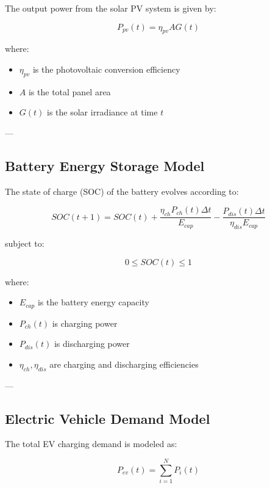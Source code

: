 The output power from the solar PV system is given by:

\begin{equation}
P_{pv}(t) = \eta_{pv} A G(t)
\label{eq:pv_power}
\end{equation}

where:
\begin{itemize}
    \item $\eta_{pv}$ is the photovoltaic conversion efficiency
    \item $A$ is the total panel area
    \item $G(t)$ is the solar irradiance at time $t$
\end{itemize}

---

\subsection{Battery Energy Storage Model}

The state of charge (SOC) of the battery evolves according to:

\begin{equation}
SOC(t+1) = SOC(t) + \frac{\eta_{ch} P_{ch}(t)\Delta t}{E_{cap}} - \frac{P_{dis}(t)\Delta t}{\eta_{dis} E_{cap}}
\label{eq:battery_soc}
\end{equation}

subject to:

\begin{equation}
0 \leq SOC(t) \leq 1
\label{eq:soc_limits}
\end{equation}

where:
\begin{itemize}
    \item $E_{cap}$ is the battery energy capacity
    \item $P_{ch}(t)$ is charging power
    \item $P_{dis}(t)$ is discharging power
    \item $\eta_{ch}, \eta_{dis}$ are charging and discharging efficiencies
\end{itemize}

---

\subsection{Electric Vehicle Demand Model}

The total EV charging demand is modeled as:

\begin{equation}
P_{ev}(t) = \sum_{i=1}^{N} P_i(t)
\label{eq:ev_demand}
\end{equation}

